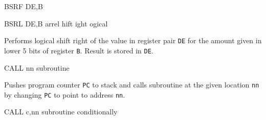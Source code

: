 \begin{basedescript}{
    \desclabelstyle{\multilinelabel}
    \desclabelwidth{3cm}}
\begin{DetailItem}{BSRF DE,B\ZXN}
        \begin{DetailTiming}
        \end{DetailTiming}

    \end{DetailItem}

    \begin{DetailItem}{BSRL DE,B\ZXN}
        {arrel hift ight ogical}
        {\SymBSRL}

        Performs logical shift right of the value in register pair {\tt DE} for the amount given in lower 5 bits of register {\tt B}. Result is stored in {\tt DE}.

        \begin{DetailEffects}
            \FlagsBSRL
        \end{DetailEffects}
		
        \begin{DetailTiming}
        \end{DetailTiming}

    \end{DetailItem}
	
    \pagebreak
    \begin{DetailItem}{CALL nn}
        { subroutine}
        {}

        Pushes program counter {\tt PC} to stack and calls subroutine at the given location {\tt nn} by changing {\tt PC} to point to address {\tt nn}.

        \begin{DetailEffects}
            \FlagsCALLnn
        \end{DetailEffects}
		
        \begin{DetailTiming}
        \end{DetailTiming}

    \end{DetailItem}

    \begin{DetailItem}{CALL c,nn}
        { subroutine conditionally}
        {}


\end{DetailItem}
\end{basedescript}
